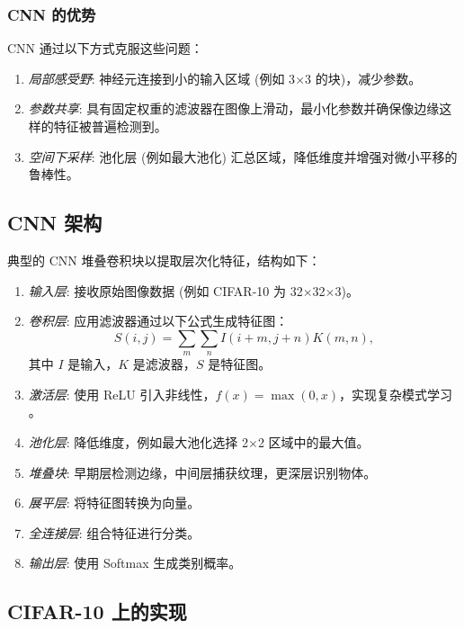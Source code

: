 \documentclass[UTF8]{report}
\theoremstyle{MyLineTheoremStyle} %
\theoremstyle{MyBlockTheoremStyle} %
\theoremstyle{MySubsubsectionStyle} %
\begin{document}
\subsubsection{CNN 的优势}

CNN 通过以下方式克服这些问题：

\begin{enumerate}[label=\roman*.]
    \item \textit{局部感受野}: 神经元连接到小的输入区域 (例如 3$\times$3 的块)，减少参数。
    \item \textit{参数共享}: 具有固定权重的滤波器在图像上滑动，最小化参数并确保像边缘这样的特征被普遍检测到。
    \item \textit{空间下采样}: 池化层 (例如最大池化) 汇总区域，降低维度并增强对微小平移的鲁棒性。
\end{enumerate}

\subsection{CNN 架构}

典型的 CNN 堆叠卷积块以提取层次化特征，结构如下：

\begin{enumerate}[label=\roman*.]
    \item \textit{输入层}: 接收原始图像数据 (例如 CIFAR-10 为 32$\times$32$\times$3)。
    \item \textit{卷积层}: 应用滤波器通过以下公式生成特征图：
        \[
        S(i, j) = \sum_{m} \sum_{n} I(i + m, j + n) K(m, n),
        \]
        其中 $I$ 是输入，$K$ 是滤波器，$S$ 是特征图。
    \item \textit{激活层}: 使用 ReLU 引入非线性，$f(x) = \max(0, x)$，实现复杂模式学习 \cite{relu}。
    \item \textit{池化层}: 降低维度，例如最大池化选择 2$\times$2 区域中的最大值。
    \item \textit{堆叠块}: 早期层检测边缘，中间层捕获纹理，更深层识别物体。
    \item \textit{展平层}: 将特征图转换为向量。
    \item \textit{全连接层}: 组合特征进行分类。
    \item \textit{输出层}: 使用 Softmax 生成类别概率。
\end{enumerate}

\subsection{CIFAR-10 上的实现}
\end{document}
